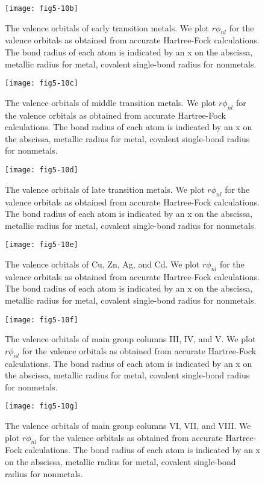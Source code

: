 \begin{figure}
\texttt{[image: fig5-10b]}
\caption{The valence orbitals of early transition metals. We plot $r
  \phi_{nl}$ for the valence orbitals as obtained from accurate
  Hartree-Fock calculations. The bond radius of each atom is indicated
  by an x on the abscissa, metallic radius for metal, covalent
  single-bond radius for nonmetals.}
\label{fig5-10b}
\end{figure}

\begin{figure}
\texttt{[image: fig5-10c]}
\caption{The valence orbitals of middle transition metals. We plot $r
  \phi_{nl}$ for the valence orbitals as obtained from accurate
  Hartree-Fock calculations. The bond radius of each atom is indicated
  by an x on the abscissa, metallic radius for metal, covalent
  single-bond radius for nonmetals.}
\label{fig5-10c}
\end{figure}

\begin{figure}
\texttt{[image: fig5-10d]}
\caption{The valence orbitals of late transition metals. We plot $r
  \phi_{nl}$ for the valence orbitals as obtained from accurate
  Hartree-Fock calculations. The bond radius of each atom is indicated
  by an x on the abscissa, metallic radius for metal, covalent
  single-bond radius for nonmetals.}
\label{fig5-10d}
\end{figure}

\begin{figure}
\texttt{[image: fig5-10e]}
\caption{The valence orbitals of Cu, Zn, Ag, and Cd. We plot $r
  \phi_{nl}$ for the valence orbitals as obtained from accurate
  Hartree-Fock calculations. The bond radius of each atom is indicated
  by an x on the abscissa, metallic radius for metal, covalent
  single-bond radius for nonmetals.}
\label{fig5-10e}
\end{figure}

\begin{figure}
\texttt{[image: fig5-10f]}
\caption{The valence orbitals of main group columns III, IV, and V. We
  plot $r \phi_{nl}$ for the valence orbitals as obtained from
  accurate Hartree-Fock calculations. The bond radius of each atom is
  indicated by an x on the abscissa, metallic radius for metal,
  covalent single-bond radius for nonmetals.}
\label{fig5-10f}
\end{figure}

\begin{figure}
\texttt{[image: fig5-10g]}
\caption{The valence orbitals of main group columns VI, VII, and
  VIII. We plot $r \phi_{nl}$ for the valence orbitals as obtained
  from accurate Hartree-Fock calculations. The bond radius of each
  atom is indicated by an x on the abscissa, metallic radius for
  metal, covalent single-bond radius for nonmetals.}
\label{fig5-10g}
\end{figure}

